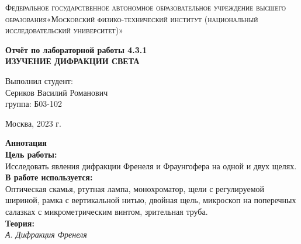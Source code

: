 \documentclass[a4paper, 12pt]{article}%
\begin{document}
	\begin{titlepage}
		\begin{center}
			\textsc{Федеральное государственное автономное образовательное учреждение высшего образования«Московский физико-технический институт (национальный исследовательский университет)»\\[5mm]
			}
			
			\vfill
			
			\textbf{Отчёт по лабораторной работы 4.3.1\\[3mm]
				ИЗУЧЕНИЕ
				ДИФРАКЦИИ СВЕТА 
				\\[50mm]
			}
			
		\end{center}
		
		\hfill
		\begin{minipage}{.5\textwidth}
			Выполнил студент:\\[2mm]
			Сериков Василий Романович\\[2mm]
			группа: Б03-102\\[5mm]
			
		\end{minipage}
		\vfill
		\begin{center}
			Москва, 2023 г.
		\end{center}
		
	\end{titlepage}
	
	\newpage
	\setcounter{page}{2}
	\textbf{Аннотация}\\
	
	\textbf{Цель работы: }\\
	
	 Исследовать явления дифракции Френеля и Фраунгофера на одной и двух щелях.\\
	 
	 \textbf{В работе используется: }\\
	 
	 Оптическая скамья, ртутная лампа, монохроматор, щели с регулируемой шириной, рамка с вертикальной нитью, двойная щель, микроскоп на поперечных салазках с микрометрическим винтом, зрительная труба.\\
	 
	 \textbf{Теория: }\\
	 
	 \textit{А. Дифракция Френеля}\\
	 
\end{document}
